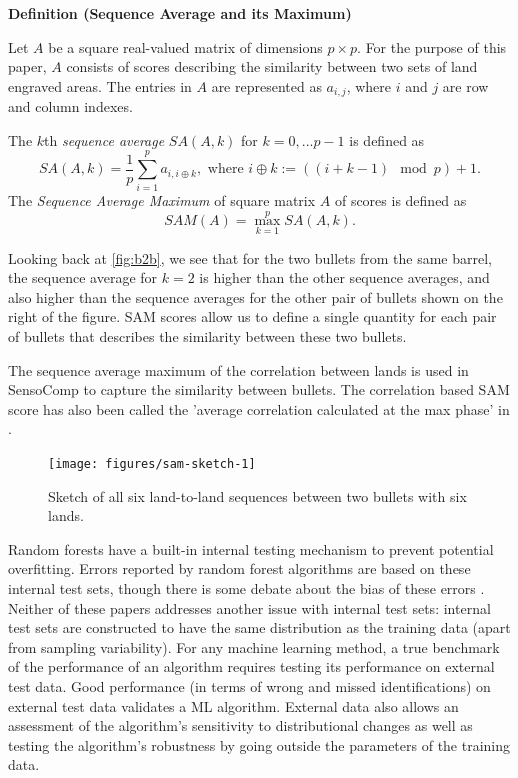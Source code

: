 \documentclass[doubleblind]{elsarticle}\usepackage[]{graphicx}\usepackage[]{color}
\newenvironment{knitrout}{}{} %
\newenvironment{definition}[1]%
{%
  \par\vspace{.75\baselineskip}\noindent 
  \textbf{Definition (#1)}\begin{itshape}%
  \par\vspace{.5\baselineskip}\noindent\ignorespaces 
}%
{%
  \end{itshape}\ignorespacesafterend 
}
\begin{document}
\begin{definition}{Sequence Average and its Maximum}
Let $A$ be a square real-valued matrix of dimensions $p \times p$. For the purpose of this paper, $A$ consists of scores describing the similarity between two sets of land engraved areas. The entries in $A$ are represented as $a_{i,j}$, where $i$ and $j$ are row and column indexes. 

The $k$th \emph{sequence average} $SA(A, k)$ for $k = 0, ... p-1$ is defined  as 
$$SA(A, k) = \frac{1}{p} \sum_{i=1}^{p} a_{i,i \oplus k}, \text{ where } i\oplus k := \left((i + k - 1)\mod p\right) + 1.$$
The \emph{Sequence Average Maximum} \citep[SAM, ][]{sam} of square matrix $A$ of scores is defined as
$$SAM (A) = \max_{k = 1}^{p} SA(A, k).$$
\end{definition}
Looking back at \autoref{fig:b2b}, we see that for the two bullets from the same barrel, the sequence average for 
$k=2$ is higher than the other sequence averages, and also higher than the sequence averages for the other pair of bullets shown on the right of the figure. SAM scores allow us to define a single quantity for each pair of bullets that describes the similarity between these two bullets. 

The sequence average maximum of the correlation between lands is used in SensoComp \citep{sensofar-sam} to capture the similarity between bullets. The correlation based SAM score has also been called the 'average correlation calculated at the max phase' in \citet{chuPilotStudyAutomated2010}. 

\begin{knitrout}
\color{fgcolor}\begin{figure}

{\centering \texttt{[image: figures/sam-sketch-1]} 

}

\caption[Sketch of all six land-to-land sequences between two bullets with six lands]{Sketch of all six land-to-land sequences between two bullets with six lands.}\label{fig:sam-sketch}
\end{figure}


\end{knitrout}


Random forests \citep{breiman} have a built-in internal testing mechanism to prevent potential overfitting. Errors reported by random forest algorithms are based on these internal test sets, though there is some debate about the bias of these errors \citep{rfOver2, rfOver}. 
Neither of these papers addresses another issue with internal test sets: internal test sets are constructed to have the same distribution as the training data (apart from sampling variability). For any machine learning method, a true benchmark of the performance of an algorithm requires testing its performance on external test data. Good performance (in terms of wrong and missed identifications) on external test data validates a ML algorithm. External data also allows an assessment of the algorithm's sensitivity to distributional changes as well as testing the algorithm's robustness by going outside the parameters of the training data.  
\end{document}
